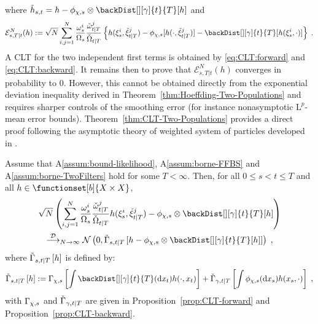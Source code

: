 where $\tilde{h}_{s,t} = h - \filt{\Xinit,s}\otimes\backDist[][\gamma]{t}{T}[h]$ and
\[
\mathcal{E}^{N}_{s,T|t}(h) \eqdef \sqrt{N}\sum_{i,j=1}^N \frac{\swght{s}{i}}{\sumwght{s}}\frac{\ebackwght{t}{T}{j}}{\backsumwght{t}{T}}\left\{h(\epartpred{s}{i},\ebackpart{t}{T}{j}) -  \filt{\Xinit,s}[h(\cdot,\ebackpart{t}{T}{j})]  - \backDist[][\gamma]{t}{T}[h(\epartpred{s}{i},\cdot)]\right\}\eqsp.
\]
A CLT for the two independent first terms is obtained by \eqref{eq:CLT:forward} and \eqref{eq:CLT:backward}. It remains then to prove that $\mathcal{E}^{N}_{s,T|t}(h)$ converges in probability to $0$. However, this cannot be obtained directly from the exponential deviation inequality derived in Theorem~\ref{thm:Hoeffding-Two-Populations} and requires sharper controls of the smoothing error (for instance nonasymptotic $\mathrm{L}^p$-mean error bounds).
Theorem~\ref{thm:CLT-Two-Populations}  provides a direct proof following the asymptotic theory of weighted system of particles developed in \cite{douc:moulines:2008}.
\begin{thm}
\label{thm:CLT-Two-Populations}
Assume that A\ref{assum:bound-likelihood}, A\ref{assum:borne-FFBS} and A\ref{assum:borne-TwoFilters} hold for some $T<\infty$. Then,  for all $0 \leq s<t \leq T$ and all $h \in \functionset[b]{X\times X}$,
\begin{multline*}
\sqrt{N}\left(\sum_{i,j=1}^N \frac{\swght{s}{i}}{\sumwght{s}}\frac{\ebackwght{t}{T}{j}}{\backsumwght{t}{T}} h(\epartpred{s}{i},\ebackpart{t}{T}{j}) - \filt{\Xinit,s}\otimes \backDist[][\gamma]{t}{T}[h]
\right) \\
\dlim_{N \to \infty} \mathcal{N}\left(0,\asymVarJoint{s,t}{T}{h- \filt{\Xinit,s}\otimes \backDist[][\gamma]{t}{T}[h]}\right) \eqsp,
\end{multline*}
where $\asymVarJoint{s,t}{T}{h}$ is defined by:
\begin{equation}
\label{eq:asymVarjoint}
\asymVarJoint{s,t}{T}{h} \eqdef \asymVar[\Xinit]{s}{\int \backDist[][\gamma]{t}{T}(\rmd x_t)h(\cdot,x_t)} +  \backasymVar[\gamma]{t}{T}{\int \filt{\Xinit,s}(\rmd x_{s}) h(x_s,\cdot)}\eqsp,
\end{equation}
with $\asymVar[\Xinit]{s}{}$ and $\backasymVar[\gamma]{t}{T}{}$ are given in Proposition~\ref{prop:CLT-forward} and Proposition~\ref{prop:CLT-backward}.
\end{thm}

